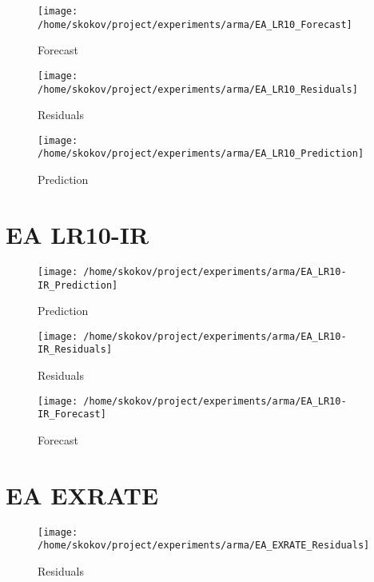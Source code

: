 \begin{figure}[h!]%
\centering%
\texttt{[image: /home/skokov/project/experiments/arma/EA\_LR10\_Forecast]}%
\caption{Forecast}%
\label{fig:EA_LR10_Forecast}%
\end{figure}

%


\begin{figure}[h!]%
\centering%
\texttt{[image: /home/skokov/project/experiments/arma/EA\_LR10\_Residuals]}%
\caption{Residuals}%
\label{fig:EA_LR10_Residuals}%
\end{figure}

%


\begin{figure}[h!]%
\centering%
\texttt{[image: /home/skokov/project/experiments/arma/EA\_LR10\_Prediction]}%
\caption{Prediction}%
\label{fig:EA_LR10_Prediction}%
\end{figure}

%
\section{EA LR10{-}IR}%


\begin{figure}[h!]%
\centering%
\texttt{[image: /home/skokov/project/experiments/arma/EA\_LR10-IR\_Prediction]}%
\caption{Prediction}%
\label{fig:EA_LR10-IR_Prediction}%
\end{figure}

%


\begin{figure}[h!]%
\centering%
\texttt{[image: /home/skokov/project/experiments/arma/EA\_LR10-IR\_Residuals]}%
\caption{Residuals}%
\label{fig:EA_LR10-IR_Residuals}%
\end{figure}

%


\begin{figure}[h!]%
\centering%
\texttt{[image: /home/skokov/project/experiments/arma/EA\_LR10-IR\_Forecast]}%
\caption{Forecast}%
\label{fig:EA_LR10-IR_Forecast}%
\end{figure}

%
\section{EA EXRATE}%


\begin{figure}[h!]%
\centering%
\texttt{[image: /home/skokov/project/experiments/arma/EA\_EXRATE\_Residuals]}%
\caption{Residuals}%
\label{fig:EA_EXRATE_Residuals}%
\end{figure}

